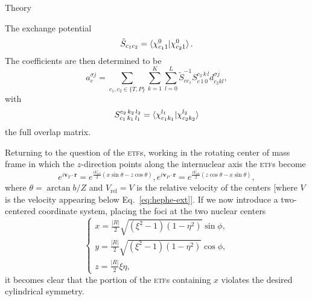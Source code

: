\documentclass[aps, pra, reprint, groupedaddress, amsfonts, longbibliography,
               amsmath, amssymb, showpacs, nofootinbib]{revtex4-1}
\begin{document}
\begin{section}{Theory \label{sec:theory}}
\begin{subsection}{The exchange potential \label{sec:xpot}}
\begin{equation}
         \tilde{S}_{c_1 c_2} = \braket{ \chi^{0}_{c_1 1} | \chi^{0}_{c_2 1} }.
      \end{equation}
      The coefficients are then determined to be
      \begin{equation} \label{eq:coef}
         a^{\sigma j}_c = \sum\limits_{c_1, c_2 \in \{T,P\}} \sum\limits_{k = 1}^K
                          \sum\limits_{l = 0}^L \tilde{S}^{-1}_{c c_1} S^{c_2 \, k \, l}_{c \, 1 \, 0}
                             d^{\sigma j}_{c_2 k l},
      \end{equation}
      with
      \begin{equation} \label{eq:overlap}
         S_{c_1 \, k_1 \, l_1 }^{c_2 \, k_2 \, l_2 } =
            \braket{ \chi^{l_1}_{c_1 k_1} | \chi^{l_2}_{c_2 k_2} }
      \end{equation}
      the full overlap matrix.

      Returning to the question of the \textsc{etf}s, working in the rotating center of mass frame in
      which the $z$-direction points along the internuclear axis the \textsc{etf}s become
      \begin{subequations} \label{eq:etf}
         \begin{equation} \label{eq:etfT}
            e^{i \mathbf{v}_T \cdot \mathbf{r}} =
             e^{\frac{i V_\mathrm{rel}}{2} (x \sin \theta - z \cos \theta)},
         \end{equation}
         \begin{equation} \label{eq:etfP}
            e^{i \mathbf{v}_P \cdot \mathbf{r}} =
             e^{\frac{i V_\mathrm{rel}}{2} (z \cos \theta - x \sin \theta)},
         \end{equation}
      \end{subequations}
      where $\theta = \arctan b/Z$ and $V_\mathrm{rel} = V$ is the relative velocity of the centers
      [where $V$ is the velocity appearing below Eq.~\eqref{eq:hephe-ext}]. If we now introduce a
      two-centered coordinate system, placing the foci at the two nuclear centers
      \begin{equation} \label{eq:psc}
            \left\{
            \begin{array}{l}
               x = \frac{|R|}{2} \sqrt{(\xi^2 - 1)(1 - \eta^2)} \sin \phi, \\ [2ex]
               y = \frac{|R|}{2} \sqrt{(\xi^2 - 1)(1 - \eta^2)} \cos \phi, \\ [2ex]
               z = \frac{|R|}{2} \xi \eta,
            \end{array}
            \right.
      \end{equation}
      it becomes clear that the portion of the \textsc{etf}s containing $x$ violates the desired
      cylindrical symmetry.


\end{subsection}
\end{section}
\end{document}
